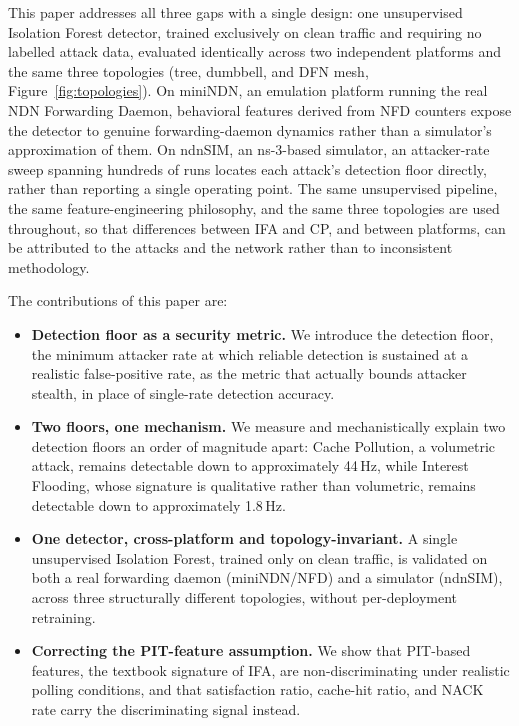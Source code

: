 This paper addresses all three gaps with a single design: one unsupervised Isolation Forest detector, trained exclusively on clean traffic and requiring no labelled attack data, evaluated identically across two independent platforms and the same three topologies (tree, dumbbell, and DFN mesh, Figure~\ref{fig:topologies}). On miniNDN, an emulation platform running the real NDN Forwarding Daemon, behavioral features derived from NFD counters expose the detector to genuine forwarding-daemon dynamics rather than a simulator's approximation of them. On ndnSIM, an ns-3-based simulator, an attacker-rate sweep spanning hundreds of runs locates each attack's detection floor directly, rather than reporting a single operating point. The same unsupervised pipeline, the same feature-engineering philosophy, and the same three topologies are used throughout, so that differences between IFA and CP, and between platforms, can be attributed to the attacks and the network rather than to inconsistent methodology.

The contributions of this paper are:

\begin{itemize}
    \item \textbf{Detection floor as a security metric.} We introduce the detection floor, the minimum attacker rate at which reliable detection is sustained at a realistic false-positive rate, as the metric that actually bounds attacker stealth, in place of single-rate detection accuracy.
    \item \textbf{Two floors, one mechanism.} We measure and mechanistically explain two detection floors an order of magnitude apart: Cache Pollution, a volumetric attack, remains detectable down to approximately 44\,Hz, while Interest Flooding, whose signature is qualitative rather than volumetric, remains detectable down to approximately 1.8\,Hz.
    \item \textbf{One detector, cross-platform and topology-invariant.} A single unsupervised Isolation Forest, trained only on clean traffic, is validated on both a real forwarding daemon (miniNDN/NFD) and a simulator (ndnSIM), across three structurally different topologies, without per-deployment retraining.
    \item \textbf{Correcting the PIT-feature assumption.} We show that PIT-based features, the textbook signature of IFA, are non-discriminating under realistic polling conditions, and that satisfaction ratio, cache-hit ratio, and NACK rate carry the discriminating signal instead.
\end{itemize}

